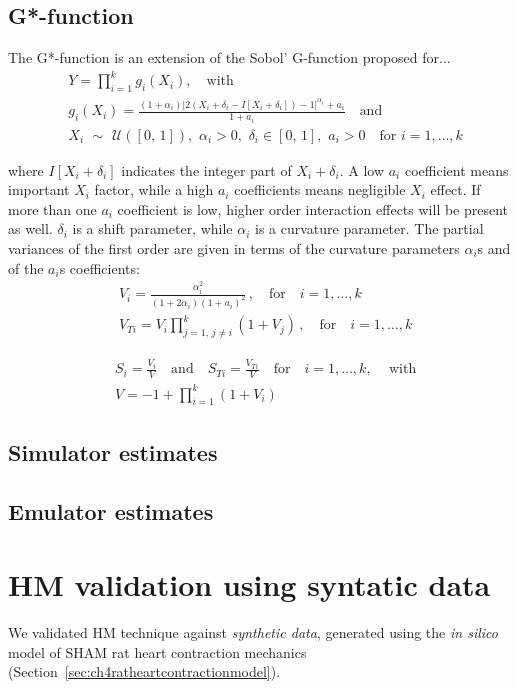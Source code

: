 %
%
%
\subsection{G*-function}
The G*-function is an extension of the Sobol' G-function proposed for...
%
\begin{align}\label{eq:sobolgfun}
	& Y = \prod_{i=1}^{k}g_i(X_i),\quad\text{with} \\
	& g_i(X_i)=\frac{(1+\alpha_i)\vert 2(X_i+\delta_i-I[X_i+\delta_i])-1\vert^{\alpha_i}+a_i}{1+a_i}\quad\text{and} \\
	& X_i\,\,\sim\,\,\mathcal{U}([0,\,1]),\,\,\alpha_i > 0,\,\,\delta_i\in [0,\,1],\,\,a_i>0\quad\text{for}\,\,i=1,\dots,k
\end{align}

\vspace{0.2cm}\noindent
where $I[X_i+\delta_i]$ indicates the integer part of $X_i+\delta_i$. A low $a_i$ coefficient means important $X_i$ factor, while a high $a_i$ coefficients means negligible $X_i$ effect. If more than one $a_i$ coefficient is low, higher order interaction effects will be present as well. $\delta_i$ is a shift parameter, while $\alpha_i$ is a curvature parameter. The partial variances of the first order are given in terms of the curvature parameters $\alpha_i$s and of the $a_i$s coefficients:
%
\begin{align}
	& V_i = \frac{\alpha_i^2}{(1+2\alpha_i)(1 + a_i)^2}\,,\quad\text{for}\quad i=1,\dots,k \\
	& V_{Ti} = V_i \prod_{j=1,\,j\neq i}^{k}(1 + V_j)\,,\quad\text{for}\quad i=1,\dots,k
\end{align}

\begin{align}
	& S_i = \frac{V_i}{V} \quad\text{and}\quad S_{Ti} = \frac{V_{Ti}}{V} \quad\text{for}\quad i=1,\dots,k,\,\quad\text{with} \\
	& V = -1 + \prod_{i=1}^{k}(1 + V_i) 
\end{align}

%
%
%
\subsection{Simulator estimates}


%
%
%
\subsection{Emulator estimates}


%
%
%
\section{HM validation using syntatic data}\label{chA:HM_validation_using_syntatic_data}
We validated HM technique against \textit{synthetic data}, generated using the \textit{in silico} model of SHAM rat heart contraction mechanics (Section~\ref{sec:ch4ratheartcontractionmodel}).

